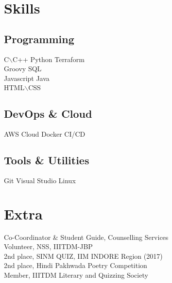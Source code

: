 \documentclass[]{single-page-resume}
\begin{document}
\begin{minipage}[t]{0.33\textwidth}

\section{Skills}
\subsection{Programming}
\textbullet{} C$\backslash$C++ \textbullet{} Python \textbullet{} Terraform \\
\textbullet{} Groovy \textbullet{} SQL \\
\textbullet{} Javascript \textbullet{} Java \\ \textbullet{}
 HTML$\backslash$CSS
 
\subsection{DevOps \& Cloud}
\textbullet{} AWS Cloud \textbullet{} Docker \textbullet{} CI/CD 

\subsection{Tools \& Utilities}
\textbullet{} Git \textbullet{} Visual Studio \textbullet{} Linux
\sectionsep

\section{Extra}
\textbullet{} Co-Coordinator & Student Guide,
Counselling Services \\
\textbullet{} Volunteer, NSS, IIITDM-JBP \\
\textbullet{} 2nd place, SINM QUIZ, IIM INDORE
Region (2017) \\
\textbullet{} 2nd place, Hindi Pakhwada Poetry
Competition \\
\textbullet{} Member, IIITDM Literary and Quizzing
Society
\sectionsep
%
%

\end{minipage} 
\hfill
\end{document}
